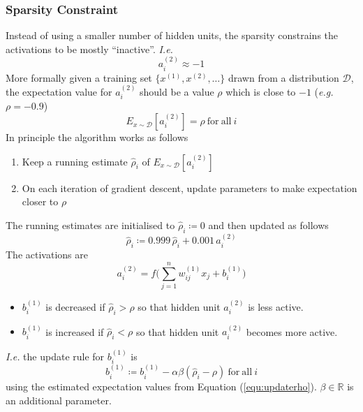 \documentclass[a4paper,twoside,10pt]{article}
\begin{document}
\subsubsection{Sparsity Constraint}
Instead of using a smaller number of hidden units, the sparsity constrains the activations to be mostly ``inactive''.
\emph{I.e.}
\begin{equation*}
  a^{(2)}_i\approx -1
\end{equation*}
More formally given a training set $\{x^{(1)},x^{(2)},\ldots\}$ drawn from a distribution $\mathcal{D}$, the expectation value for $a^{(2)}_i$ should be a value $\rho$ which is close to $-1$ (\emph{e.g.} $\rho=-0.9$)
\begin{equation*}
  E_{x\sim\mathcal{D}}[a^{(2)}_i]=\rho\mathrm{\ for\ all\ }i
\end{equation*}
In principle the algorithm works as follows
\begin{enumerate}
  \item Keep a running estimate $\widehat{\rho}_i$ of $E_{x\sim\mathcal{D}}[a^{(2)}_i]$
  \item On each iteration of gradient descent, update parameters to make expectation closer to $\rho$
\end{enumerate}
The running estimates are initialised to $\widehat{\rho}_i\coloneqq 0$ and then updated as follows
\begin{equation}\label{equ:updaterho}
  \widehat{\rho}_i\coloneqq 0.999\,\widehat{\rho}_i+0.001\,a^{(2)}_i
\end{equation}
The activations are
\begin{equation*}
  a^{(2)}_i=f\big(\sum_{j=1}^nw^{(1)}_{ij}x_j+b^{(1)}_i\big)
\end{equation*}
\begin{itemize}
  \item $b^{(1)}_i$ is decreased if $\widehat{\rho}_i>\rho$ so that hidden unit $a^{(2)}_i$ is less active.
  \item $b^{(1)}_i$ is increased if $\widehat{\rho}_i<\rho$ so that hidden unit $a^{(2)}_i$ becomes more active.
\end{itemize}
\emph{I.e.} the update rule for $b^{(1)}_i$ is
\begin{equation}\label{equ:updateb}
  b^{(1)}_i\coloneqq b^{(1)}_i-\alpha\beta(\widehat{\rho}_i-\rho)\mathrm{\ for\ all\ }i
\end{equation}
using the estimated expectation values from Equation (\ref{equ:updaterho}).
$\beta\in\mathbb{R}$ is an additional parameter.
\end{document}
